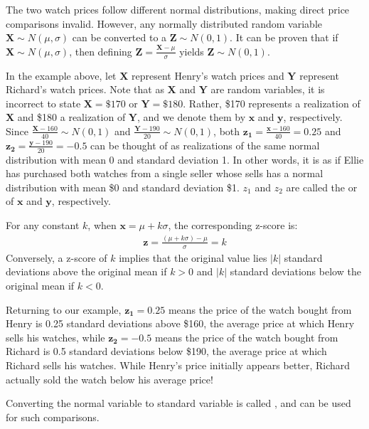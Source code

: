 The two watch prices follow different normal distributions, making direct price comparisons invalid.
However, any normally distributed random variable \( \bm{X} \sim N(\mu, \sigma) \) can be converted to a  \( \bm{Z} \sim N(0, 1) \).
It can be proven that if \( \bm{X} \sim N(\mu, \sigma) \), then defining \( \bm{Z} = \frac{\bm{X} - \mu}{\sigma} \) yields \( \bm{Z} \sim N(0, 1) \).

In the example above, let \( \bm{X} \) represent Henry's watch prices and \( \bm{Y} \) represent Richard's watch prices.
Note that as \( \bm{X} \) and \( \bm{Y} \) are random variables, it is incorrect to state \( \bm{X} = \$170 \) or \( \bm{Y} = \$180 \).
Rather, \$170 represents a realization of \( \bm{X} \) and \$180 a realization of \( \bm{Y} \), and we denote them by \( \bm{x} \) and \( \bm{y} \), respectively.
Since \( \frac{\bm{X} - 160}{40} \sim N(0, 1) \) and \( \frac{\bm{Y} - 190}{20} \sim N(0, 1) \), both \( \bm{z_1} = \frac{\bm{x} - 160}{40} = 0.25 \) and \( \bm{z_2} = \frac{\bm{y} - 190}{20} = -0.5 \) can be thought of as realizations of the same normal distribution with mean 0 and standard deviation 1.
In other words, it is as if Ellie has purchased both watches from a single seller whose sells has a normal distribution with mean \$0 and standard deviation \$1.
\( z_1 \) and \( z_2 \) are called the  or  of \( \bm{x} \) and \( \bm{y} \), respectively.

For any constant \( k \), when \( \bm{x} = \mu + k\sigma \), the corresponding z-score is:
\begin{gather*}
    \bm{z} = \frac{(\mu + k\sigma) - \mu}{\sigma} = k
\end{gather*}
Conversely, a z-score of \( k \) implies that the original value lies \( |k| \) standard deviations above the original mean if \( k > 0 \) and \( |k| \) standard deviations below the original mean if \( k < 0 \).

Returning to our example, \( \bm{z_1} = 0.25 \) means the price of the watch bought from Henry is 0.25 standard deviations above \$160, the average price at which Henry sells his watches,
while \( \bm{z_2} = -0.5 \) means the price of the watch bought from Richard is 0.5 standard deviations below \$190, the average price at which Richard sells his watches.
While Henry's price initially appears better, Richard actually sold the watch below his average price!

Converting the normal variable to standard variable is called , and can be used for such comparisons.

